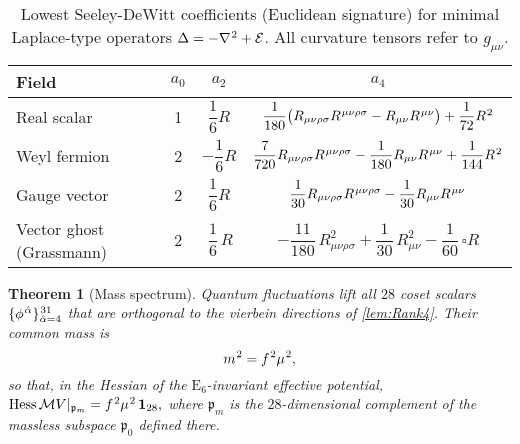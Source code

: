 \documentclass[pdflatex,sn-mathphys-num]{sn-jnl}
\theoremstyle{thmstyleone}
\newtheorem{theorem}{Theorem}
\theoremstyle{thmstyletwo}%
\theoremstyle{thmstylethree}%
\newcommand{\E}[1]{\mathrm{E_{#1}}}
\newcommand{\M}{\mathcal{M}}
\newcommand{\ESix}{\E{6}}
\newcommand{\sm}{\hspace{.065em}}
\newcommand{\smexp}[1]{^{\sm #1}}
\newcommand{\Hess}[1]{\operatorname{Hess}}
\renewcommand{\arraystretch}{1.25}
\begin{document}
\begin{table}[h]
\centering
\caption{Lowest Seeley-DeWitt coefficients (Euclidean signature)
for minimal Laplace-type operators
$\Delta=-\nabla\smexp{2}+\mathcal E$.
All curvature tensors refer to $g_{\mu\nu}$.}
\label{tab:SDWcoeffs}
\renewcommand{\arraystretch}{1.5}
\begin{tabular}{lccc}
\hline
Field & $a_{0}$ & $a_{2}$ & $a_{4}$ \\
\hline
Real scalar & 
1 & 
$\dfrac{1}{6}R$ & 
\rule{0pt}{1.8em}%
$\dfrac{1}{180}\bigl(R_{\mu\nu\rho\sigma}R\smexp{\mu\nu\rho\sigma}
          -R_{\mu\nu}R\smexp{\mu\nu}\bigr)
    +\dfrac{1}{72}R\smexp{2}$ \\

Weyl fermion & 
2 & 
$-\dfrac{1}{6}R$ & 
\rule{0pt}{2.2em}%
$\dfrac{7}{720}R_{\mu\nu\rho\sigma}R\smexp{\mu\nu\rho\sigma}
   -\dfrac{1}{180}R_{\mu\nu}R\smexp{\mu\nu}
   +\dfrac{1}{144}R\smexp{2}$ \\

Gauge vector & 
2 & 
$\dfrac{1}{6}R$ & 
\rule{0pt}{2.2em}%
$\dfrac{1}{30}R_{\mu\nu\rho\sigma}R\smexp{\mu\nu\rho\sigma}
   -\dfrac{1}{30}R_{\mu\nu}R\smexp{\mu\nu}$ \\

Vector ghost (Grassmann) & 2 & $\,\dfrac16\,R$ & \rule{0pt}{2.2em} $-\dfrac{11}{180}\,R_{\mu\nu\rho\sigma}^{2}
          +\dfrac{1}{30}\,R_{\mu\nu}^{2}
          -\dfrac{1}{60}\,\square R$ \\[6pt]
\hline
\end{tabular}
\end{table}

\begin{theorem}[Mass spectrum]
\label{thm:Mass28}
Quantum fluctuations lift all $28$ coset scalars
$\{\phi\smexp{\hat\alpha}\}_{\hat\alpha=4}\smexp{31}$ that are orthogonal to
the vierbein directions of \autoref{lem:Rank4}.  Their common mass is
\[
  m\smexp{2}=f\smexp{2}\mu\smexp{2},
\]
so that, in the Hessian of the $\ESix$-invariant effective potential,
\(
  \Hess_{\M}V|_{\mathfrak p_{m}}
  =f\smexp{2}\mu\smexp{2}\,\mathbf 1_{28},
\)
where $\mathfrak p_{m}$ is the $28$-dimensional complement of the
massless subspace $\mathfrak p_{0}$ defined there.
\end{theorem}
\end{document}

